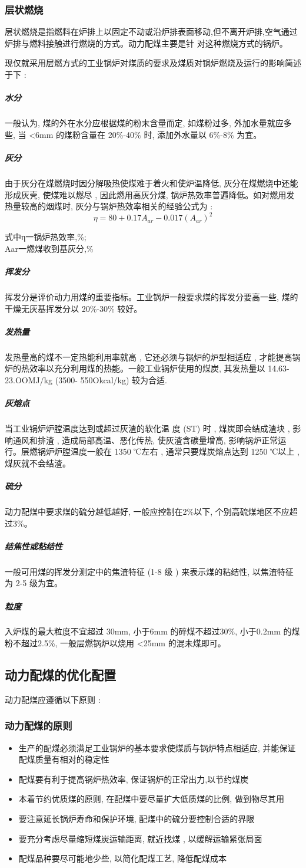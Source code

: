 \documentclass[10pt,openany]{ctexbook}
\begin{document}
\subsubsection{层状燃烧}
层状燃烧是指燃料在炉排上以固定不动或沿炉排表面移动,但不离开炉排,空气通过炉排与燃料接触进行燃烧的方式。动力配煤主要是针 对这种燃烧方式的锅炉。  \par
现仅就采用层燃方式的工业锅炉对煤质的要求及煤质对锅炉燃烧及运行的影响简述于下 :
\subparagraph{水分}  一般认为, 煤的外在水分应根据煤的粉末含量而定, 如煤粉过多, 外加水量就应多些, 当 <6mm 的煤粉含量在 20\%-40\% 时, 添加外水量以 6\%-8\% 为宜。
\subparagraph{灰分} 由于灰分在煤燃烧时因分解吸热使煤难于着火和使炉温降低, 灰分在煤燃烧中还能形成灰壳, 使煤难以燃尽 , 因此燃用高灰分煤, 锅炉热效率普遍降低。如对燃用发热量较高的烟煤时, 灰分与锅炉热效率相关的经验公式为 :
$$\eta =80+0.17A_{ar}-0.017(A_{ar})^2 $$
\begin{center}
	式中η一锅炉热效率,\%;\\
	Aar一燃煤收到基灰分,\%
\end{center}
\subparagraph{挥发分}
挥发分是评价动力用煤的重要指标。工业锅炉一般要求煤的挥发分要高一些, 煤的干燥无灰基挥发分以 20\%-30\% 较好。
\subparagraph{发热量}
发热量高的煤不一定热能利用率就高 , 它还必须与锅炉的炉型相适应 , 才能提高锅炉的热效率以充分利用煤的热能。一般工业锅炉使用的煤炭, 其发热量以 14.63-23.OOMJ/kg (3500- 550Okcal/kg) 较为合适.
\subparagraph{灰熔点}
当工业锅炉炉膛温度达到或超过灰渣的软化温 度 (ST) 时 , 煤炭即会结成渣块 , 影响通风和排渣 , 造成局部高温、恶化传热, 使灰渣含碳量增高, 影响锅炉正常运行。层燃锅炉炉膛温度一般在 1350 ℃左右 , 通常只要煤炭熔点达到 1250 ℃以上 , 煤灰就不会结渣。
\subparagraph{硫分}
动力配煤中要求煤的硫分越低越好, 一般应控制在2\%以下, 个别高硫煤地区不应超过3\%。
\subparagraph{结焦性或粘结性} 一般可用煤的挥发分测定中的焦渣特征 (1-8 级 ) 来表示煤的粘结性, 以焦渣特征为 2-5 级为宜。
\subparagraph{粒度}  入炉煤的最大粒度不宜超过 30mm, 小于6mm 的碎煤不超过30\%, 小于0.2mm 的煤粉不超过2.5\%, 一般层燃锅炉以烧用 <25mm 的混未煤即可。
\subsection{动力配煤的优化配置}
动力配煤应遵循以下原则 :
\subsubsection{动力配煤的原则}
\begin{itemize}
\item 生产的配煤必须满足工业锅炉的基本要求使煤质与锅炉特点相适应, 并能保证配煤质量有相对的稳定性
\item 配煤要有利于提高锅炉热效率, 保证锅炉的正常出力,以节约煤炭
\item 本着节约优质煤的原则, 在配煤中要尽量扩大低质煤的比例, 做到物尽其用
\item 要注意延长锅炉寿命和保护环境, 配煤中的硫分要控制合适的界限
\item 要充分考虑尽量缩短煤炭运输距离, 就近找煤 , 以缓解运输紧张局面
\item  配煤品种要尽可能地少些, 以简化配煤工艺, 降低配煤成本
\end{itemize}
\end{document}
